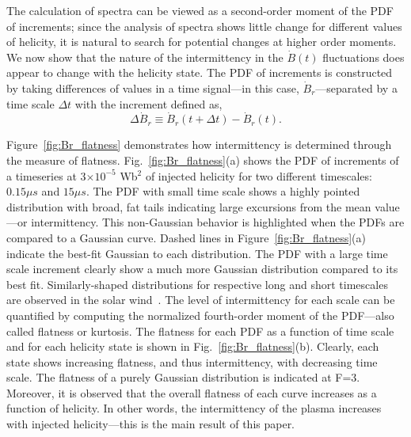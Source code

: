 \documentclass[aps,prl,amsmath,amssymb,reprint,superscriptaddress]{revtex4-1} %
\begin{document}
The calculation of spectra can be viewed as a second-order moment of the PDF of increments; since the analysis of spectra shows little change for different values of helicity, it is natural to search for potential changes at higher order moments. We now show that the nature of the intermittency in the $\dot{B}(t)$ fluctuations does appear to change with the helicity state. The PDF of increments is constructed by taking differences of values in a time signal---in this case, $\dot{B}_{r}$---separated by a time scale $\Delta t$ with the increment defined as,
\begin{equation}
\Delta \dot{B}_r \equiv \dot{B}_r(t + \Delta t)- \dot{B}_r(t).
\label{eq:increment}
\end{equation}

Figure~\ref{fig:Br_flatness} demonstrates how intermittency is determined through the measure of flatness.  Fig.~\ref{fig:Br_flatness}(a) shows the PDF of increments of a timeseries at 3$\times 10^{-5}$ Wb$^{2}$ of injected helicity for two different timescales: $0.15\mu s$ and $15\mu s$.  The PDF with small time scale shows a highly pointed distribution with broad, fat tails indicating large excursions from the mean value---or intermittency. This non-Gaussian behavior is highlighted when the PDFs are compared to a Gaussian curve. Dashed lines in Figure~\ref{fig:Br_flatness}(a) indicate the best-fit Gaussian to each distribution. The PDF with a large time scale increment clearly show a much more Gaussian distribution compared to its best fit. Similarly-shaped distributions for respective long and short timescales are observed in the solar wind~\cite{sorrisovalvo99}. The level of intermittency for each scale can be quantified by computing the normalized fourth-order moment of the PDF---also called flatness or kurtosis. The flatness for each PDF as a function of time scale and for each helicity state is shown in Fig.~\ref{fig:Br_flatness}(b). Clearly, each state shows increasing flatness, and thus intermittency, with decreasing time scale. The flatness of a purely Gaussian distribution is indicated at F=3. Moreover, it is observed that the overall flatness of each curve increases as a function of helicity. In other words, the intermittency of the plasma increases with injected helicity---this is the main result of this paper.
\end{document}
